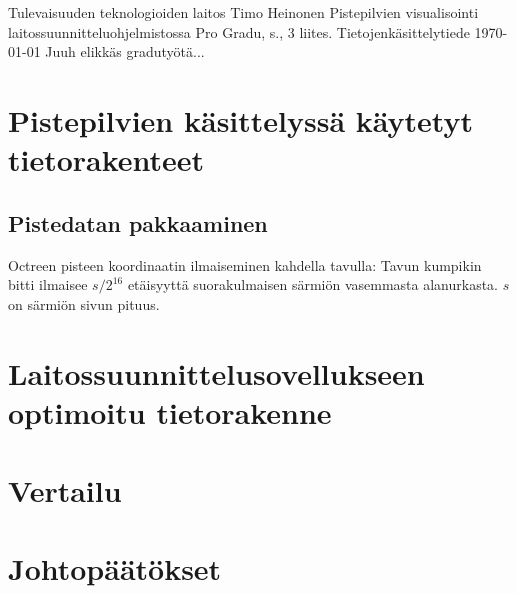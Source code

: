 \newpage
\begin{tiivistelma}%
        {Tulevaisuuden teknologioiden laitos}%
        {Timo Heinonen}%
        {Pistepilvien visualisointi laitossuunnitteluohjelmistossa}
        {Pro Gradu, \pageref{LastPage} s., 3 liites.}%
        {Tietojenkäsittelytiede}%
        {\today}%
	Juuh elikkäs gradutyötä...
\end{tiivistelma}

\tableofcontents %
\newpage




\section{Pistepilvien käsittelyssä käytetyt tietorakenteet}

\subsection{Pistedatan pakkaaminen}
Octreen pisteen koordinaatin ilmaiseminen kahdella tavulla: Tavun kumpikin bitti ilmaisee $s/2^{16}$ etäisyyttä suorakulmaisen särmiön vasemmasta alanurkasta. $s$ on särmiön sivun pituus. \cite{Elseberg}





\section{Laitossuunnittelusovellukseen optimoitu tietorakenne}


\section{Vertailu}


\section{Johtopäätökset}









\renewcommand{\baselinestretch}{1}\large\normalsize





